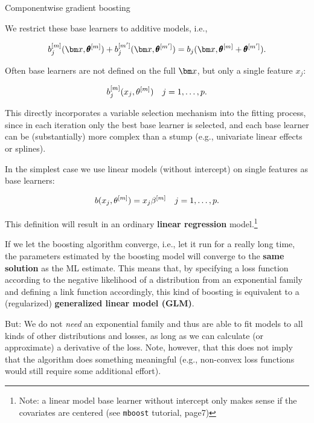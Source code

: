 \begin{vbframe}{Componentwise gradient boosting}
\framebreak

We restrict these base learners to additive models, i.e.,

$$
 b_j^{[m]}(\xv,\pmb\theta^{[m]}) + b_j^{[m^\prime]}(\xv,\pmb\theta^{[m^\prime]}) = b_j(\xv,\pmb\theta^{[m]} + \pmb\theta^{[m^\prime]}).
$$

\lz

Often base learners are not defined on the full $\xv$, but only a single feature $x_j$:

$$
  b_j^{[m]}(x_j,\theta^{[m]}) \quad j = 1,\dots, p.
$$

\lz
This directly incorporates a variable selection mechanism into the fitting process,
since in each iteration only the best base learner is selected, and each base learner can be (substantially) more complex than a stump (e.g., univariate linear effects or splines).

\framebreak




\framebreak

In the simplest case we use linear models (without intercept) on single features as base learners:

$$
  b(x_j,\theta^{[m]}) = x_j\beta^{[m]} \quad j = 1,\dots,p.
$$

This definition will result in an ordinary \textbf{linear regression} model.\footnote{Note: a linear model base learner without intercept only makes sense if the covariates are centered (see \texttt{mboost} tutorial, page7)}

\lz

If we let the boosting algorithm converge, i.e., let it run for a really long time, the parameters estimated by the boosting model will converge to the \textbf{same solution} as the ML estimate. This means that, by specifying a loss function according to the negative likelihood of a distribution from an exponential family and defining a link function accordingly, this kind of boosting is equivalent to a (regularized) \textbf{generalized linear model (GLM)}.

\framebreak

But: We do not \emph{need} an exponential family and thus are able to fit models to all kinds of other distributions and losses, as long as we can calculate (or approximate) a derivative of the loss. Note, however, that this does not imply that the algorithm does something meaningful (e.g., non-convex loss functions would still require some additional effort).


\end{vbframe}
